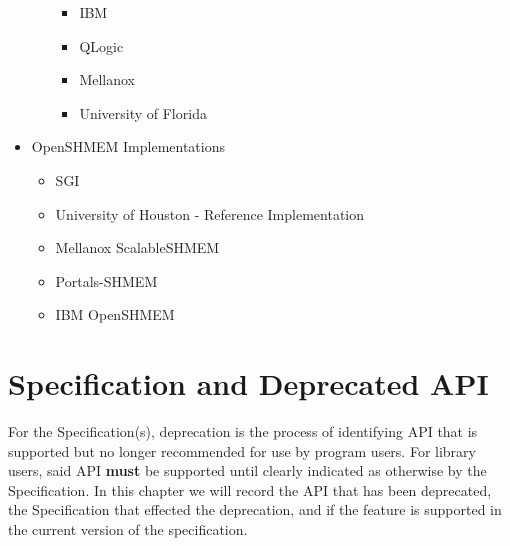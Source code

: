 \begin{itemize}
\begin{itemize}
\begin{itemize}
    \item IBM
    \item QLogic
    \item Mellanox
    \item University of Florida
    \end{itemize}
  \end{itemize}
\item OpenSHMEM Implementations 
 \begin{itemize}
  \item SGI \openshmem
  \item University of Houston - \openshmem Reference Implementation
  \item Mellanox ScalableSHMEM
  \item Portals-SHMEM
  \item IBM OpenSHMEM
  \end{itemize}
\end{itemize}








\chapter{\openshmem Specification and Deprecated API}\label{sec:dep_api}

For the \openshmem Specification(s), deprecation is the process of identifying
API that is supported but no longer recommended for use by program users. For
\openshmem library users, said API \textbf{must} be supported until clearly
indicated as otherwise by the Specification. In this chapter we will record the
API that has been deprecated, the \openshmem Specification that effected the
deprecation, and if the feature is supported in the current version of the
specification.  

